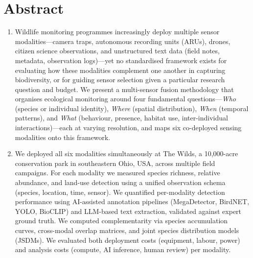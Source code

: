 \documentclass[12pt]{article}
\begin{document}
\newpage


\section*{Abstract}

\begin{enumerate}
    \item Wildlife monitoring programmes increasingly deploy multiple sensor modalities---camera traps, autonomous recording units (ARUs), drones, citizen science observations, and unstructured text data (field notes, metadata, observation logs)---yet no standardised framework exists for evaluating how these modalities complement one another in capturing biodiversity, or for guiding sensor selection given a particular research question and budget. We present a multi-sensor fusion methodology that organises ecological monitoring around four fundamental questions---\textit{Who} (species or individual identity), \textit{Where} (spatial distribution), \textit{When} (temporal patterns), and \textit{What} (behaviour, presence, habitat use, inter-individual interactions)---each at varying resolution, and maps six co-deployed sensing modalities onto this framework.

    \item We deployed all six modalities simultaneously at The Wilds, a 10,000-acre conservation park in southeastern Ohio, USA, across multiple field campaigns. For each modality we measured species richness, relative abundance, and land-use detection using a unified observation schema (species, location, time, sensor). We quantified per-modality detection performance using AI-assisted annotation pipelines (MegaDetector, BirdNET, YOLO, BioCLIP) and LLM-based text extraction, validated against expert ground truth. We computed complementarity via species accumulation curves, cross-modal overlap matrices, and joint species distribution models (JSDMs). We evaluated both deployment costs (equipment, labour, power) and analysis costs (compute, AI inference, human review) per modality.


\end{enumerate}
\end{document}
